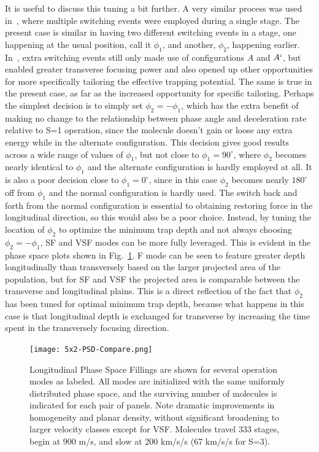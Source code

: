 It is useful to discuss this tuning a bit further. 
A very similar process was used in~\cite{Zhang2016}, where multiple switching events were employed during a single stage.
The present case is similar in having two different switching events in a stage, one happening at the usual position, call it $\phi_1$, and another, $\phi_2$, happening earlier.
In~\cite{Zhang2016}, extra switching events still only made use of configurations $A$ and $A`$, but enabled greater transverse focusing power and also opened up other opportunities for more specifically tailoring the effective trapping potential.
The same is true in the present case, as far as the increased opportunity for specific tailoring. 
Perhaps the simplest decision is to simply set $\phi_2=-\phi_1$, which has the extra benefit of making no change to the relationship between phase angle and deceleration rate relative to S=1 operation,  since the molecule doesn't gain or loose any extra energy while in the alternate configuration.
This decision gives good results across a wide range of values of $\phi_1$, but not close to $\phi_1=90^\circ$, where $\phi_2$ becomes nearly identical to $\phi_1$ and the alternate configuration is hardly employed at all.
It is also a poor decision close to $\phi_1=0^\circ$, since in this case $\phi_2$ becomes nearly $180^\circ$ off from $\phi_1$ and the normal configuration is hardly used.
The switch back and forth from the normal configuration is essential to obtaining restoring force in the longitudinal direction, so this would also be a poor choice.
Instead, by tuning the location of $\phi_2$ to optimize the minimum trap depth and not always choosing $\phi_2=-\phi_1$, SF and VSF modes can be more fully leveraged.
This is evident in the phase space plots shown in Fig.~\ref{full5x2phasespace}. 
F mode can be seen to feature greater depth longitudinally than transversely based on the larger projected area of the population, but for SF and VSF the projected area is comparable between the transverse and longitudinal plains.
This is a direct reflection of the fact that $\phi_2$ has been tuned for optimal minimum trap depth, because what happens in this case is that longitudinal depth is exchanged for transverse by increasing the time spent in the transversely focusing direction.

\begin{figure}[t!]
\texttt{[image: 5x2-PSD-Compare.png]}
\caption[Longitudinal Phase Space for different Modes]{\label{full5x2phasespace}
Longitudinal Phase Space Fillings are shown for several operation modes as labeled. 
All modes are initialized with the same uniformly distributed phase space, and the surviving number of molecules is indicated for each pair of panels.
Note dramatic improvements in homogeneity and planar density, without significant broadening to larger velocity classes except for VSF. 
Molecules travel $333$ stages, begin at 900 m/s, and slow at 200 km/s/s (67 km/s/s for S=3).
}
\end{figure}

